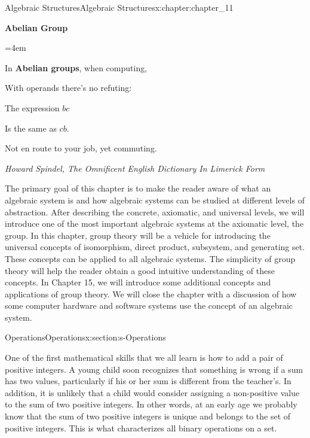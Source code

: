 \documentclass[twoside,10pt,]{book}
\newcommand{\terminology}[1]{\textbf{#1}}
\numberwithin{equation}{section}
\newenvironment{poem}{\setlength{\parindent}{0em}}{}
\newcommand{\poemTitle}[1]{\begin{center}\large\textbf{#1}\end{center}}
\newenvironment{stanza}{\vspace{0.25 em}\hangindent=4em}{\vspace{1 em}}
\newcommand{\poemauthorleft}[1]{\vspace{-1em}\begin{flushleft}\textit{#1}\end{flushleft}}
\newcommand{\poemlineleft}[1]{{\raggedright{#1}\par}\vspace{-\parskip}}
\begin{document}
\begin{chapterptx}{Algebraic Structures}{}{Algebraic Structures}{}{}{x:chapter:chapter_11}
\begin{introduction}{}%
\begin{poem}%
\poemTitle{Abelian Group}
\begin{stanza}
\poemlineleft{In \terminology{Abelian groups}, when computing,}
\poemlineleft{With operands there's no refuting:}
\poemlineleft{The expression \(bc\)}
\poemlineleft{Is the same as \(cb\).}
\poemlineleft{Not en route to your job, yet commuting.}
\end{stanza}
\poemauthorleft{Howard Spindel, The Omnificent English Dictionary In Limerick Form}
\end{poem}
The primary goal of this chapter is to make the reader aware of what an algebraic system is and how algebraic systems can be studied at different levels of abstraction. After describing the concrete, axiomatic, and universal levels, we will introduce one of the most important algebraic systems at the axiomatic level, the group. In this chapter, group theory will be a vehicle for introducing the universal concepts of isomorphism, direct product, subsystem, and generating set. These concepts can be applied to all algebraic systems. The simplicity of group theory will help the reader obtain a good intuitive understanding of these concepts. In Chapter 15, we will introduce some additional concepts and applications of group theory. We will close the chapter with a discussion of how some computer hardware and software systems use the concept of an algebraic system.%
\end{introduction}%
%
%
\typeout{************************************************}
\typeout{************************************************}
%
\begin{sectionptx}{Operations}{}{Operations}{}{}{x:section:s-Operations}
%
\begin{introduction}{}%
One of the first mathematical skills that we all learn is how to add a pair of positive integers. A young child soon recognizes that something is wrong if a sum has two values, particularly if his or her sum is different from the teacher's. In addition, it is unlikely that a child would consider assigning a non-positive value to the sum of two positive integers. In other words, at an early age we probably know that the sum of two positive integers is unique and belongs to the set of positive integers. This is what characterizes all binary operations on a set.%

\end{introduction}
\end{sectionptx}
\end{chapterptx}
\end{document}
